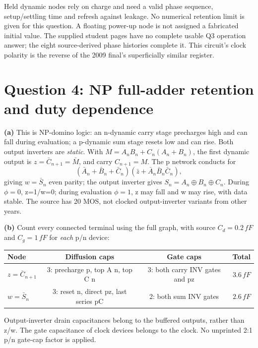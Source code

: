 \documentclass[10pt]{article}
\begin{document}
Held dynamic nodes rely on charge and need a valid phase sequence, setup/settling time and refresh against leakage. No numerical retention limit is given for this question. A floating power-up node is not assigned a fabricated initial value. The supplied student pages have no complete usable Q3 operation answer; the eight source-derived phase histories complete it. This circuit's clock polarity is the reverse of the 2009 final's superficially similar register.

\newpage\section*{Question 4: NP full-adder retention and duty dependence}
\textbf{(a)} This is NP-domino logic: an n-dynamic carry stage precharges high and can fall during evaluation; a p-dynamic sum stage resets low and can rise. Both output inverters are \emph{static}. With $M=A_nB_n+C_n(A_n+B_n)$, the first dynamic output is $z=\bar C_{n+1}=\bar M$, and carry $C_{n+1}=M$. The p network conducts for
\[(\bar A_n+\bar B_n+\bar C_n)(\bar z+\bar A_n\bar B_n\bar C_n),\]
giving $w=\bar S_n$ even parity; the output inverter gives $S_n=A_n\oplus B_n\oplus C_n$. During $\phi=0$, z=1/w=0; during evaluation $\phi=1$, z may fall and w may rise, with data stable. The source has 20 MOS, not clocked output-inverter variants from other years.

\textbf{(b)} Count every connected terminal using the full graph, with source $C_d=0.2\,fF$ and $C_g=1\,fF$ for \emph{each} p/n device:
\begin{center}\begin{tabular}{l|ccr}\toprule
Node&Diffusion caps&Gate caps&Total\\\midrule
$z=\bar C_{n+1}$&3: precharge p, top A n, top C n&3: both carry INV gates and pz&$3.6\,fF$\\
$w=\bar S_n$&3: reset n, direct pz, last series pC&2: both sum INV gates&$2.6\,fF$\\\bottomrule
\end{tabular}\end{center}
Output-inverter drain capacitances belong to the buffered outputs, rather than z/w. The gate capacitance of clock devices belongs to the clock. No unprinted 2:1 p/n gate-cap factor is applied.
\end{document}
